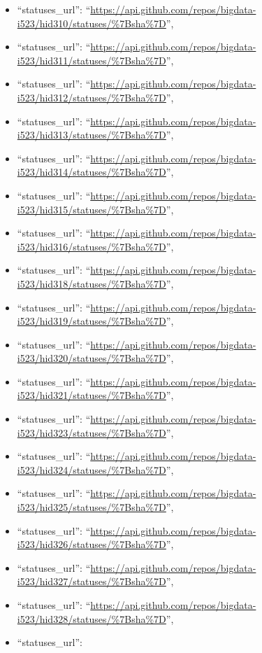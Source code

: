\begin{itemize}
\item
  ``statuses\_url'':
  ``\url{https://api.github.com/repos/bigdata-i523/hid310/statuses/\%7Bsha\%7D}'',
\item
  ``statuses\_url'':
  ``\url{https://api.github.com/repos/bigdata-i523/hid311/statuses/\%7Bsha\%7D}'',
\item
  ``statuses\_url'':
  ``\url{https://api.github.com/repos/bigdata-i523/hid312/statuses/\%7Bsha\%7D}'',
\item
  ``statuses\_url'':
  ``\url{https://api.github.com/repos/bigdata-i523/hid313/statuses/\%7Bsha\%7D}'',
\item
  ``statuses\_url'':
  ``\url{https://api.github.com/repos/bigdata-i523/hid314/statuses/\%7Bsha\%7D}'',
\item
  ``statuses\_url'':
  ``\url{https://api.github.com/repos/bigdata-i523/hid315/statuses/\%7Bsha\%7D}'',
\item
  ``statuses\_url'':
  ``\url{https://api.github.com/repos/bigdata-i523/hid316/statuses/\%7Bsha\%7D}'',
\item
  ``statuses\_url'':
  ``\url{https://api.github.com/repos/bigdata-i523/hid318/statuses/\%7Bsha\%7D}'',
\item
  ``statuses\_url'':
  ``\url{https://api.github.com/repos/bigdata-i523/hid319/statuses/\%7Bsha\%7D}'',
\item
  ``statuses\_url'':
  ``\url{https://api.github.com/repos/bigdata-i523/hid320/statuses/\%7Bsha\%7D}'',
\item
  ``statuses\_url'':
  ``\url{https://api.github.com/repos/bigdata-i523/hid321/statuses/\%7Bsha\%7D}'',
\item
  ``statuses\_url'':
  ``\url{https://api.github.com/repos/bigdata-i523/hid323/statuses/\%7Bsha\%7D}'',
\item
  ``statuses\_url'':
  ``\url{https://api.github.com/repos/bigdata-i523/hid324/statuses/\%7Bsha\%7D}'',
\item
  ``statuses\_url'':
  ``\url{https://api.github.com/repos/bigdata-i523/hid325/statuses/\%7Bsha\%7D}'',
\item
  ``statuses\_url'':
  ``\url{https://api.github.com/repos/bigdata-i523/hid326/statuses/\%7Bsha\%7D}'',
\item
  ``statuses\_url'':
  ``\url{https://api.github.com/repos/bigdata-i523/hid327/statuses/\%7Bsha\%7D}'',
\item
  ``statuses\_url'':
  ``\url{https://api.github.com/repos/bigdata-i523/hid328/statuses/\%7Bsha\%7D}'',
\item
  ``statuses\_url'':

\end{itemize}
